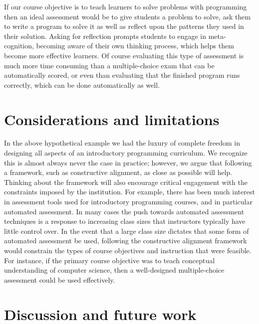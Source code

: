 \documentclass[12pt]{article}
\begin{document}
If our course objective is to teach learners to solve problems with
programming then an ideal assessment would be to give students a
problem to solve, ask them to write a program to solve it as well as
reflect upon the patterns they used in their solution. Asking for
reflection prompts students to engage in meta-cognition, becoming
aware of their own thinking process, which helps them become more
effective
learners\autocite{ambrose_how_2010,chi_selfexplanations_1989}. Of
course evaluating this type of assessment is much more time consuming
than a multiple-choice exam that can be automatically scored, or even
than evaluating that the finished program runs correctly, which can be
done automatically as well\autocite{cheang_automated_2003}.

\section*{Considerations and limitations}
In the above hypothetical example we had the luxury of complete
freedom in designing all aspects of an introductory programming
curriculum. We recognize this is almost always never the case in
practice; however, we argue that following a framework, such as
constructive alignment, as close as possible will help. Thinking about
the framework will also encourage critical engagement with the
constraints imposed by the institution. For example, there has been
much interest in assessment tools used for introductory programming
courses\autocite{lister_blooming_2000,lister_objectives_2001,sheard_exploring_2011},
and in particular automated
assessment\autocite{cheang_automated_2003,traynor_synthesis_2005,ihantola_review_2010}. In
many cases the push towards automated assessment techniques is a
response to increasing class sizes that instructors typically have
little control over. In the event that a large class size dictates
that some form of automated assessment be used, following the
constructive alignment framework would constrain the types of course
objectives and instruction that were feasible. For instance, if the
primary course objective was to teach conceptual understanding of
computer science, then a well-designed multiple-choice assessment
could be used
effectively\autocite{lister_blooming_2000,lister_objectives_2001}.

\section*{Discussion and future work}
\end{document}
